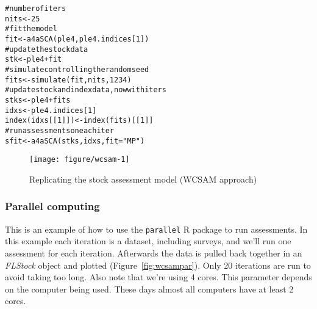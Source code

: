 \documentclass[a4paper,english,10pt]{article}\usepackage[]{graphicx}\usepackage[]{color}
\makeatletter
\def\maxwidth{ %
  \ifdim\Gin@nat@width>\linewidth
    \linewidth
  \else
    \Gin@nat@width
  \fi
}
\newcommand{\hlnum}[1]{\textcolor[rgb]{0.2,0.2,0.2}{#1}}%
\newcommand{\hlstr}[1]{\textcolor[rgb]{0.2,0.2,0.2}{#1}}%
\newcommand{\hlcom}[1]{\textcolor[rgb]{0.2,0.267,0.4}{#1}}%
\newcommand{\hlopt}[1]{\textcolor[rgb]{0.2,0.2,0.2}{#1}}%
\newcommand{\hlstd}[1]{\textcolor[rgb]{0,0,0}{#1}}%
\newcommand{\hlkwb}[1]{\textcolor[rgb]{0.361,0.506,0.596}{#1}}%
\newcommand{\hlkwc}[1]{\textcolor[rgb]{0.361,0.506,0.596}{#1}}%
\newcommand{\hlkwd}[1]{\textcolor[rgb]{0.361,0.506,0.596}{#1}}%
\newenvironment{kframe}{%
 \def\at@end@of@kframe{}%
 \ifinner\ifhmode%
  \def\at@end@of@kframe{\end{minipage}}%
  \begin{minipage}{\columnwidth}%
 \fi\fi%
 \def\FrameCommand##1{\hskip\@totalleftmargin \hskip-\fboxsep
 \colorbox{shadecolor}{##1}\hskip-\fboxsep
     \hskip-\linewidth \hskip-\@totalleftmargin \hskip\columnwidth}%
 \MakeFramed {\advance\hsize-\width
   \@totalleftmargin\z@ \linewidth\hsize
   \@setminipage}}%
 {\par\unskip\endMakeFramed%
 \at@end@of@kframe}
\newenvironment{knitrout}{}{} %
\newcommand{\pkg}[1]{{\texttt{#1}}}
\newcommand{\class}[1]{{\textit{#1}}}
\makeatother
\begin{document}
\begin{knitrout}
\color{fgcolor}\begin{kframe}
\begin{alltt}
\hlcom{# number of iters}
\hlstd{nits} \hlkwb{<-} \hlnum{25}
\hlcom{# fit the model}
\hlstd{fit} \hlkwb{<-} \hlkwd{a4aSCA}\hlstd{(ple4, ple4.indices[}\hlnum{1}\hlstd{])}
\hlcom{# update the stock data}
\hlstd{stk} \hlkwb{<-} \hlstd{ple4} \hlopt{+} \hlstd{fit}
\hlcom{# simulate controlling the random seed}
\hlstd{fits} \hlkwb{<-} \hlkwd{simulate}\hlstd{(fit, nits,} \hlnum{1234}\hlstd{)}
\hlcom{# update stock and index data, now with iters}
\hlstd{stks} \hlkwb{<-} \hlstd{ple4} \hlopt{+} \hlstd{fits}
\hlstd{idxs} \hlkwb{<-} \hlstd{ple4.indices[}\hlnum{1}\hlstd{]}
\hlkwd{index}\hlstd{(idxs[[}\hlnum{1}\hlstd{]])} \hlkwb{<-} \hlkwd{index}\hlstd{(fits)[[}\hlnum{1}\hlstd{]]}
\hlcom{# run assessments on each iter}
\hlstd{sfit} \hlkwb{<-} \hlkwd{a4aSCA}\hlstd{(stks, idxs,} \hlkwc{fit}\hlstd{=}\hlstr{"MP"}\hlstd{)}
\end{alltt}
\end{kframe}
\end{knitrout}

\begin{knitrout}
\color{fgcolor}\begin{figure}[H]

{\centering \texttt{[image: figure/wcsam-1]} 

}

\caption[Replicating the stock assessment model (WCSAM approach)]{Replicating the stock assessment model (WCSAM approach)}\label{fig:wcsam}
\end{figure}


\end{knitrout}

\subsubsection{Parallel computing}

This is an example of how to use the \pkg{parallel} R package to run assessments. In this example each iteration is a dataset, including surveys, and we'll run one assessment for each iteration. Afterwards the data is pulled back together in an \class{FLStock} object and plotted (Figure~\ref{fig:wcsampar}). Only 20 iterations are run to avoid taking too long. Also note that we're using 4 cores. This parameter depends on the computer being used. These days almost all computers have at least 2 cores.
\end{document}
